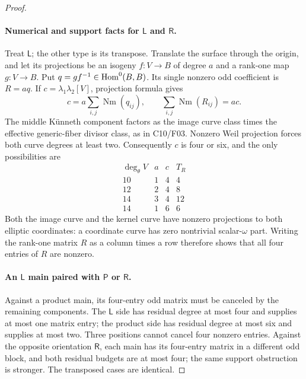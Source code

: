\begin{proof}
\paragraph{Numerical and support facts for $\mathsf L$ and $\mathsf R$.}
Treat $\mathsf L$; the other type is its transpose. Translate the
surface through the origin, and let its projections be an isogeny
$f:V\to B$ of degree $a$ and a rank-one map $g:V\to B$. Put
$q=g f^{-1}\in\operatorname{Hom}^0(B,B)$. Its single nonzero odd coefficient is
$R=a q$. If $c=\lambda_1\lambda_2[V]$, projection formula gives
\[
 c=a\sum_{i,j}\operatorname{Nm}(q_{ij}),\qquad
 \sum_{i,j}\operatorname{Nm}(R_{ij})=ac.
\]
The middle K\"unneth component factors as the image curve class
times the effective generic-fiber divisor class, as in C10/F03.
Nonzero Weil projection forces both curve degrees at least two.
Consequently $c$ is four or six, and the only possibilities are
\[
\begin{array}{c|c|c|c}
 \deg_\theta V&a&c&T_R\\ \hline
 10&1&4&4\\
 12&2&4&8\\
 14&3&4&12\\
 14&1&6&6
\end{array}
\]
Both the image curve and the kernel curve have nonzero projections to
both elliptic coordinates: a coordinate curve has zero nontrivial
scalar-$\omega$ part. Writing the rank-one matrix $R$ as a column
times a row therefore shows that all four entries of $R$ are nonzero.

\paragraph{An $\mathsf L$ main paired with $\mathsf P$ or $\mathsf R$.}
Against a product main, its four-entry odd matrix must be canceled
by the remaining components. The $\mathsf L$ side has residual degree
at most four and supplies at most one matrix entry; the product side
has residual degree at most six and supplies at most two. Three
positions cannot cancel four nonzero entries. Against the opposite
orientation $\mathsf R$, each main has its four-entry matrix in a
different odd block, and both residual budgets are at most four;
the same support obstruction is stronger. The transposed cases are
identical.


\end{proof}
